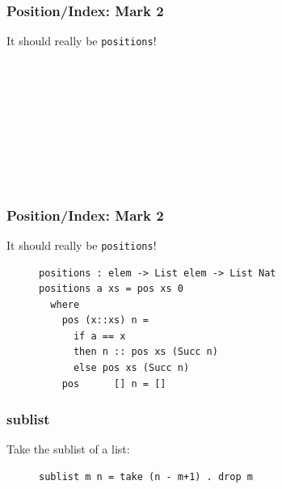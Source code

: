 \documentclass{beamer}
\begin{document}

  \begin{frame}[fragile]
    \frametitle{Position/Index: Mark 2}
    It should really be \texttt{positions}!
    \begin{figure}
    {\color{dark-gray}
      \centering
\begin{BVerbatim}
                                         
                         
       
                   
               
                               
                          
                      
\end{BVerbatim}
    }
    \end{figure}
  \end{frame}
  \begin{frame}[fragile]
    \frametitle{Position/Index: Mark 2}
    It should really be \texttt{positions}!
    \begin{figure}
    {\color{dark-gray}
      \centering
\begin{BVerbatim}
positions : elem -> List elem -> List Nat
positions a xs = pos xs 0
  where
    pos (x::xs) n =
      if a == x
      then n :: pos xs (Succ n)
      else pos xs (Succ n)
    pos      [] n = []
\end{BVerbatim}
    }
    \end{figure}
  \end{frame}


  \begin{frame}[fragile]
    \frametitle{sublist}
    Take the sublist of a list:
    \begin{figure}
    {\color{dark-gray}
      \centering
\begin{BVerbatim}
sublist m n = take (n - m+1) . drop m
\end{BVerbatim}
    }
    \end{figure}
  \end{frame}
\end{document}
